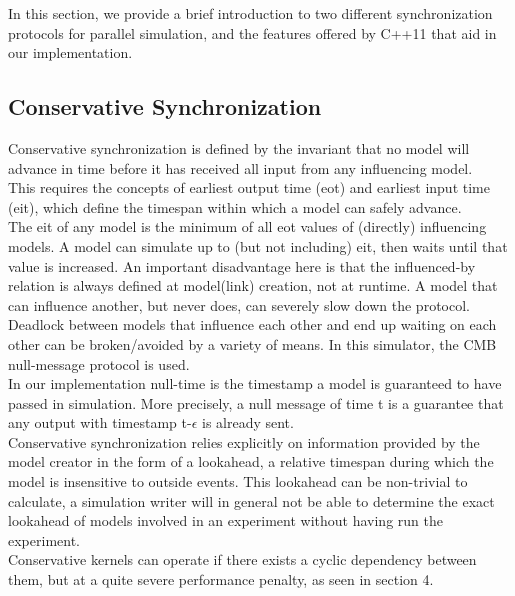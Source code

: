 In this section, we provide a brief introduction to two different synchronization protocols for parallel simulation, and the features offered by C++11 that aid in our implementation.

\subsection{Conservative Synchronization}
Conservative synchronization is defined by the invariant that no model will advance in time before it has received all input from any influencing model. \\
This requires the concepts of earliest output time (eot) and earliest input time (eit), which define the timespan within which a model can safely advance. \\ The eit of any model is the minimum of all eot values of (directly) influencing models. A model can simulate up to (but not including) eit, then waits until that value is increased. An important disadvantage here is that the influenced-by relation is always defined at model(link) creation, not at runtime. A model that can influence another, but never does, can severely slow down the protocol. 
Deadlock between models that influence each other and end up waiting on each other can be broken/avoided by a variety of means. In this simulator, the CMB \cite{Chandy:1981:ADS:358598.358613} null-message protocol is used. \\
In our implementation null-time is the timestamp a model is guaranteed to have passed in simulation. More precisely, a null message of time t is a guarantee that any output with timestamp t-$\epsilon$ is already sent.\\
Conservative synchronization relies explicitly on information provided by the model creator in the form of a lookahead, a relative timespan during which the model is insensitive to outside events. This lookahead can be non-trivial to calculate, a simulation writer will in general not be able to determine the exact lookahead of models involved in an experiment without having run the experiment.\\ Conservative kernels can operate if there exists a cyclic dependency between them, but at a quite severe performance penalty, as seen in section 4.
